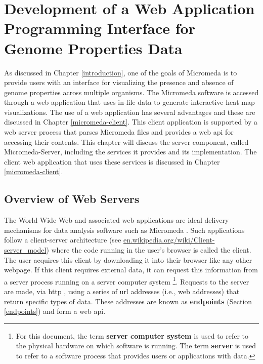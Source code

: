 \chapter{Development of a Web Application Programming Interface for Genome Properties Data} \label{micromeda-server}

As discussed in Chapter \ref{introduction}, one of the goals of Micromeda is to provide users with an interface for visualizing the presence and absence of genome properties across multiple organisms. The Micromeda software is accessed through a web application that uses in-file data to generate interactive heat map visualizations. The use of a web application has several advantages and these are discussed in Chapter \ref{micromeda-client}. This client application is supported by a web server process that parses Micromeda files and provides a web \gls{api} for accessing their contents. This chapter will discuss the server component, called Micromeda-Server, including the services it provides and its implementation. The client web application that uses these services is discussed in Chapter \ref{micromeda-client}.

\section{Overview of Web Servers} \label{web-servers}

The World Wide Web and associated web applications are ideal delivery mechanisms for data analysis software such as Micromeda \cite{berners1994world}. Such applications follow a client-server architecture \cite{svobodova1985client} (see \href{http://en.wikipedia.org/wiki/Client-server_model}{en.wikipedia.org/wiki/Client-server\_model}) where the code running in the user's browser is called the client. The user acquires this client by downloading it into their browser like any other webpage. If this client requires external data, it can request this information from a server process running on a server computer system \footnote{For this document, the term \textbf{server computer system} is used to refer to the physical hardware on which software is running. The term \textbf{server} is used to refer to a software process that provides users or applications with data.}. Requests to the server are made, via \gls{http} \cite{fielding1999hypertext}, using a series of \gls{url} addresses \cite{berners1994rfc} (i.e., web addresses) that return specific types of data. These addresses are known as \textbf{endpoints} (Section \ref{endpoints}) and form a web \gls{api}.

